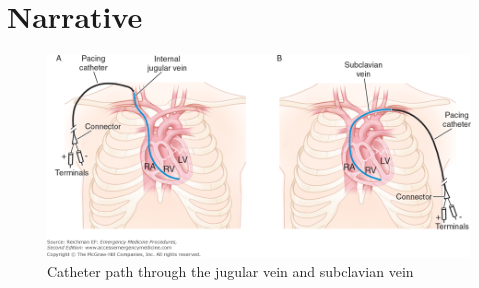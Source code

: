 \documentclass[titlepage]{article}
\begin{document}
\section{Narrative}

\begin{figure}[h!]
\centering
\includegraphics[scale=0.5]{transvenous}
\caption{Catheter path through the jugular vein and subclavian vein \cite{reichman2013emprocedures}}
\label{fig:universe}
\end{figure}

\clearpage


\end{document}
